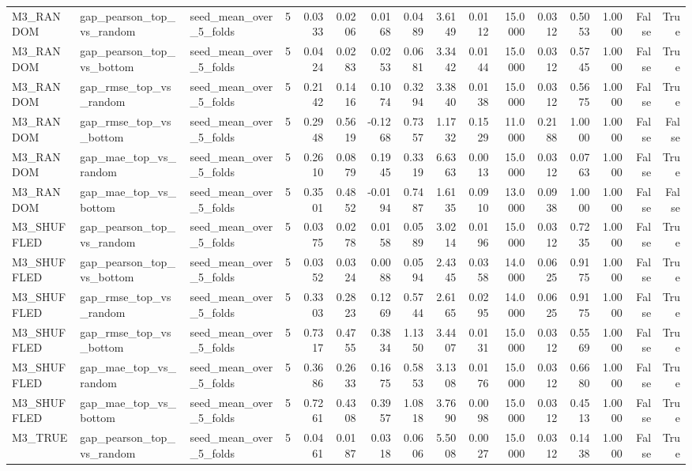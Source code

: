 \begin{tabular}{lllrrrrrrrrrrrrr}
M3_RANDOM & gap_pearson_top_vs_random & seed_mean_over_5_folds & 5 & 0.0333 & 0.0206 & 0.0168 & 0.0489 & 3.6149 & 0.0112 & 15.0000 & 0.0312 & 0.5053 & 1.0000 & False & True \\
M3_RANDOM & gap_pearson_top_vs_bottom & seed_mean_over_5_folds & 5 & 0.0424 & 0.0283 & 0.0253 & 0.0681 & 3.3442 & 0.0144 & 15.0000 & 0.0312 & 0.5745 & 1.0000 & False & True \\
M3_RANDOM & gap_rmse_top_vs_random & seed_mean_over_5_folds & 5 & 0.2142 & 0.1416 & 0.1074 & 0.3294 & 3.3840 & 0.0138 & 15.0000 & 0.0312 & 0.5675 & 1.0000 & False & True \\
M3_RANDOM & gap_rmse_top_vs_bottom & seed_mean_over_5_folds & 5 & 0.2948 & 0.5619 & -0.1268 & 0.7357 & 1.1732 & 0.1529 & 11.0000 & 0.2188 & 1.0000 & 1.0000 & False & False \\
M3_RANDOM & gap_mae_top_vs_random & seed_mean_over_5_folds & 5 & 0.2610 & 0.0879 & 0.1945 & 0.3319 & 6.6363 & 0.0013 & 15.0000 & 0.0312 & 0.0763 & 1.0000 & False & True \\
M3_RANDOM & gap_mae_top_vs_bottom & seed_mean_over_5_folds & 5 & 0.3501 & 0.4852 & -0.0194 & 0.7487 & 1.6135 & 0.0910 & 13.0000 & 0.0938 & 1.0000 & 1.0000 & False & False \\
M3_SHUFFLED & gap_pearson_top_vs_random & seed_mean_over_5_folds & 5 & 0.0375 & 0.0278 & 0.0158 & 0.0589 & 3.0214 & 0.0196 & 15.0000 & 0.0312 & 0.7235 & 1.0000 & False & True \\
M3_SHUFFLED & gap_pearson_top_vs_bottom & seed_mean_over_5_folds & 5 & 0.0352 & 0.0324 & 0.0088 & 0.0594 & 2.4345 & 0.0358 & 14.0000 & 0.0625 & 0.9175 & 1.0000 & False & True \\
M3_SHUFFLED & gap_rmse_top_vs_random & seed_mean_over_5_folds & 5 & 0.3303 & 0.2823 & 0.1269 & 0.5744 & 2.6165 & 0.0295 & 14.0000 & 0.0625 & 0.9175 & 1.0000 & False & True \\
M3_SHUFFLED & gap_rmse_top_vs_bottom & seed_mean_over_5_folds & 5 & 0.7317 & 0.4755 & 0.3834 & 1.1350 & 3.4407 & 0.0131 & 15.0000 & 0.0312 & 0.5569 & 1.0000 & False & True \\
M3_SHUFFLED & gap_mae_top_vs_random & seed_mean_over_5_folds & 5 & 0.3686 & 0.2633 & 0.1675 & 0.5853 & 3.1308 & 0.0176 & 15.0000 & 0.0312 & 0.6680 & 1.0000 & False & True \\
M3_SHUFFLED & gap_mae_top_vs_bottom & seed_mean_over_5_folds & 5 & 0.7261 & 0.4308 & 0.3957 & 1.0818 & 3.7690 & 0.0098 & 15.0000 & 0.0312 & 0.4513 & 1.0000 & False & True \\
M3_TRUE & gap_pearson_top_vs_random & seed_mean_over_5_folds & 5 & 0.0461 & 0.0187 & 0.0318 & 0.0606 & 5.5008 & 0.0027 & 15.0000 & 0.0312 & 0.1438 & 1.0000 & False & True \\

\end{tabular}
